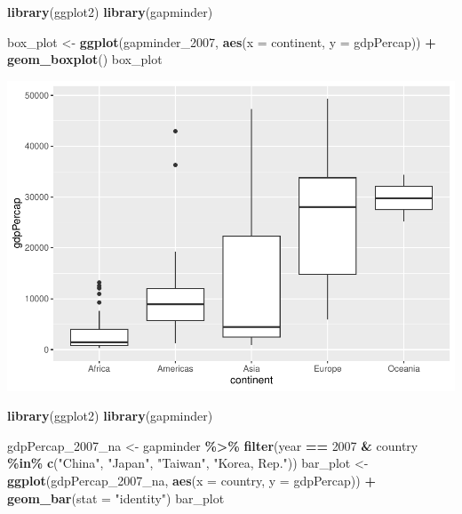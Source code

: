 \documentclass[
]{book}
\newenvironment{Shaded}{\begin{snugshade}}{\end{snugshade}}
\newcommand{\AttributeTok}[1]{\textcolor[rgb]{0.13,0.29,0.53}{#1}}
\newcommand{\DecValTok}[1]{\textcolor[rgb]{0.00,0.00,0.81}{#1}}
\newcommand{\FunctionTok}[1]{\textcolor[rgb]{0.13,0.29,0.53}{\textbf{#1}}}
\newcommand{\NormalTok}[1]{#1}
\newcommand{\OtherTok}[1]{\textcolor[rgb]{0.56,0.35,0.01}{#1}}
\newcommand{\SpecialCharTok}[1]{\textcolor[rgb]{0.81,0.36,0.00}{\textbf{#1}}}
\newcommand{\StringTok}[1]{\textcolor[rgb]{0.31,0.60,0.02}{#1}}
\theoremstyle{definition}
\theoremstyle{definition}
\theoremstyle{definition}
\theoremstyle{definition}
\theoremstyle{remark}
\begin{document}
\begin{Shaded}
\begin{Highlighting}[]
\FunctionTok{library}\NormalTok{(ggplot2)}
\FunctionTok{library}\NormalTok{(gapminder)}

\NormalTok{box\_plot }\OtherTok{\textless{}{-}} \FunctionTok{ggplot}\NormalTok{(gapminder\_2007, }\FunctionTok{aes}\NormalTok{(}\AttributeTok{x =}\NormalTok{ continent, }\AttributeTok{y =}\NormalTok{ gdpPercap)) }\SpecialCharTok{+}
  \FunctionTok{geom\_boxplot}\NormalTok{()}
\NormalTok{box\_plot}
\end{Highlighting}
\end{Shaded}

\includegraphics{202402211401-R_files/figure-latex/unnamed-chunk-22-1.pdf}

\begin{Shaded}
\begin{Highlighting}[]
\FunctionTok{library}\NormalTok{(ggplot2)}
\FunctionTok{library}\NormalTok{(gapminder)}

\NormalTok{gdpPercap\_2007\_na }\OtherTok{\textless{}{-}}\NormalTok{ gapminder }\SpecialCharTok{\%\textgreater{}\%}
  \FunctionTok{filter}\NormalTok{(year }\SpecialCharTok{==} \DecValTok{2007} \SpecialCharTok{\&}\NormalTok{ country }\SpecialCharTok{\%in\%} \FunctionTok{c}\NormalTok{(}\StringTok{"China"}\NormalTok{, }\StringTok{"Japan"}\NormalTok{, }\StringTok{"Taiwan"}\NormalTok{, }\StringTok{"Korea, Rep."}\NormalTok{))}
\NormalTok{bar\_plot }\OtherTok{\textless{}{-}} \FunctionTok{ggplot}\NormalTok{(gdpPercap\_2007\_na, }\FunctionTok{aes}\NormalTok{(}\AttributeTok{x =}\NormalTok{ country, }\AttributeTok{y =}\NormalTok{ gdpPercap)) }\SpecialCharTok{+}
  \FunctionTok{geom\_bar}\NormalTok{(}\AttributeTok{stat =} \StringTok{"identity"}\NormalTok{)}
\NormalTok{bar\_plot}
\end{Highlighting}
\end{Shaded}
\end{document}
